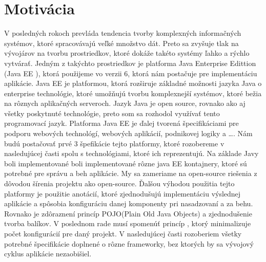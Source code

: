 \section{Motivácia}
V posledných rokoch prevláda tendencia tvorby komplexných informačných systémov, ktoré spracovávajú veľké množstvo dát. Preto sa zvyšuje tlak na vývojárov na tvorbu prostriedkov, ktoré dokáže takéto systémy ľahko a rýchlo vytvárať. Jedným z takýchto prostriedkov je platforma Java Enterprise Edittion (Java EE ), ktorá použijeme vo verzii 6, ktorá nám postačuje pre implementáciu aplikácie. Java EE je platformou, ktorá rozširuje základné možnosti jazyka Java o enterprise technológie, ktoré umožňujú tvorbu komplexnejší systémov, ktoré bežia na rôznych aplikačných serveroch. Jazyk Java je open source, rovnako ako aj všetky poskytnuté technológie, preto som sa rozhodol využívať tento programovací jazyk. Platforma Java EE je ďalej tvorená špecifikáciami pre podporu webových technológí, webových aplikácií, podnikovej logiky a \ldots. Nám budú postačovať prvé 3 špefikácie tejto platformy, ktoré rozobereme v nasledujúcej časti spolu s technológiami, ktoré ich reprezentujú. Na základe Javy boli implementované boli implementované rôzne java EE kontajnery, ktoré sú potrebné pre správu a beh aplikácie. My sa zameriame na open-source riešenia z dôvodou šírenia projektu ako open-source. Ďalšou výhodou použitia tejto platformy je použitie anotácií, ktoré zjednodušujú implementáciu výslednej aplikácie a spôsobia konfiguráciu danej komponenty pri nasadzovaní a za behu. Rovnako je zdôraznení princíp POJO(Plain Old Java Objects)\cite{pojobook} a zjednodušenie tvorba balíkov. V poslednom rade musí spomenúť princíp , ktorý minimalizuje počet konfigurácií pre daný projekt. V nasledujúcej časti rozoberiem všetky potrebné špecifikácie doplnené o rôzne frameworky, bez ktorých by sa vývojový cyklus aplikácie nezaobišiel.


